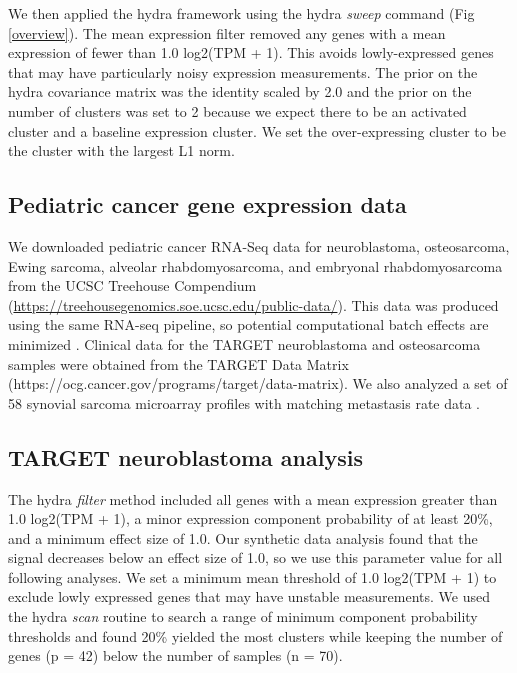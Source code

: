 \documentclass[10pt,letterpaper]{article}
\begin{document}
We then applied the hydra framework using the hydra \textit{sweep} command (Fig \ref{overview}). The mean expression filter removed any genes with a mean expression of fewer than 1.0 log2(TPM + 1). This avoids lowly-expressed genes that may have particularly noisy expression measurements. The prior on the hydra covariance matrix was the identity scaled by 2.0 and the prior on the number of clusters was set to 2 because we expect there to be an activated cluster and a baseline expression cluster. We set the over-expressing cluster to be the cluster with the largest L1 norm.
 

\subsection*{Pediatric cancer gene expression data}
We downloaded pediatric cancer RNA-Seq data for neuroblastoma, osteosarcoma, Ewing sarcoma, alveolar rhabdomyosarcoma, and embryonal rhabdomyosarcoma from the UCSC Treehouse Compendium (\url{https://treehousegenomics.soe.ucsc.edu/public-data/}). This data was produced using the same RNA-seq pipeline, so potential computational batch effects are minimized \cite{vivianToilEnablesReproducible2017,vaskeComparativeTumorRNA2019}. Clinical data for the TARGET neuroblastoma and osteosarcoma samples were obtained from the TARGET Data Matrix (https://ocg.cancer.gov/programs/target/data-matrix). We also analyzed a set of 58 synovial sarcoma microarray profiles with matching metastasis rate data \cite{lagardeChromosomeInstabilityAccounts2013}.
 
\subsection*{TARGET neuroblastoma analysis}
The hydra \textit{filter} method included all genes with a mean expression greater than 1.0 log2(TPM + 1), a minor expression component probability of at least 20\%, and a minimum effect size of 1.0. Our synthetic data analysis found that the signal decreases below an effect size of 1.0, so we use this parameter value for all following analyses. We set a minimum mean threshold of 1.0 log2(TPM + 1) to exclude lowly expressed genes that may have unstable measurements. We used the hydra \textit{scan} routine to search a range of minimum component probability thresholds and found 20\% yielded the most clusters while keeping the number of genes (p = 42) below the number of samples (n = 70). 
\end{document}
